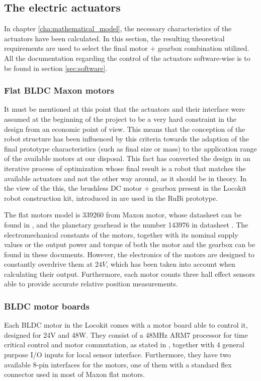 
\subsection{The electric actuators} %
\label{sub:electric_actuators}
In chapter \ref{cha:mathematical_model}, the necessary characteristics of the actuators have been calculated.
In this section, the resulting theoretical requirements are used to select the final motor $+$ gearbox combination utilized.
All the documentation regarding the control of the actuators software-wise is to be found in section \ref{sec:software}.

\subsubsection{Flat BLDC Maxon motors} %
\label{ssub:the_bldc_motors}
It must be mentioned at this point that the actuators and their interface were assumed at the beginning of the project to be a very hard constraint in the design from an economic point of view. 
This means that the conception of the robot structure has been influenced by this criteria towards the adaption of the final prototype characteristics (such as final size or mass) to the application range of the available motors at our disposal.
This fact has converted the design in an iterative process of optimization whose final result is a robot that matches the available actuators and not the other way around, as it should be in theory.
In the view of the this, the brushless DC motor $+$ gearbox present in the Locokit robot construction kit, introduced in \cite{locokit} are used in the RuBi prototype.

The flat motors model is 339260 from Maxon motor, whose datasheet can be found in \cite{maxon_motor}, and the planetary gearhead is the number 143976 in datasheet \cite{maxon_gear}.
The electromechanical constants of the motors, together with its nominal supply values or the output power and torque of both the motor and the gearbox can be found in these documents. 
However, the electronics of the motors are designed to constantly overdrive them at $24V$, which has been taken into account when calculating their output.
Furthermore, each motor counts three hall effect sensors able to provide accurate relative position measurements.


\subsubsection{BLDC motor boards} %
\label{ssub:bldc_motor_boards}
Each BLDC motor in the Locokit comes with a motor board able to control it, designed for 24V and 48W.
They consist of a 48MHz ARM7 processor for time critical control and motor commutation, as stated in \cite{locokit-electronics}, together with 4 general purpose I/O inputs for local sensor interface.
Furthermore, they have two available 8-pin interfaces for the motors, one of them with a standard flex connector used in most of Maxon flat motors.

